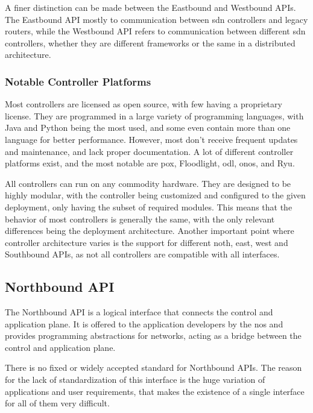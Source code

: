 A finer distinction can be made between the Eastbound and Westbound APIs\cite{kreutz_software-defined_2015}. The Eastbound API mostly to communication between \gls{sdn} controllers and legacy routers, while the Westbound API refers to communication between different \gls{sdn} controllers, whether they are different frameworks or the same in a distributed architecture. 


\subsubsection{Notable Controller Platforms}
Most controllers are licensed as open source, with few having a proprietary license. They are programmed in a large variety of programming languages, with Java and Python being the most used, and some even contain more than one language for better performance. However, most don't receive frequent updates and maintenance, and lack proper documentation\cite{zhu_sdn_2020}. A lot of different controller platforms exist, and the most notable are \gls{pox}, Floodlight, \gls{odl}, \gls{onos}, and Ryu. 

All controllers can run on any commodity hardware\cite{kreutz_software-defined_2015}. They are designed to be highly modular, with the controller being customized and configured to the given deployment, only having the subset of required modules\cite{peterson_software-defined_2021}. This means that the behavior of most controllers is generally the same, with the only relevant differences being the deployment architecture. Another important point where controller architecture varies is the support for different noth, east, west and Southbound APIs, as not all controllers are compatible with all interfaces. 

\subsection{Northbound API} %
The Northbound API is a logical interface that connects the control and application plane. It is offered to the application developers by the \gls{nos}\cite{kreutz_software-defined_2015} and provides programming abstractions for networks, acting as a bridge between the control and application plane\cite{latif_comprehensive_2020}.

There is no fixed or widely accepted standard for Northbound APIs\cite{kreutz_software-defined_2015}\cite{latif_comprehensive_2020}. The reason for the lack of standardization of this interface is the huge variation of applications and user requirements, that makes the existence of a single interface for all of them very difficult.

